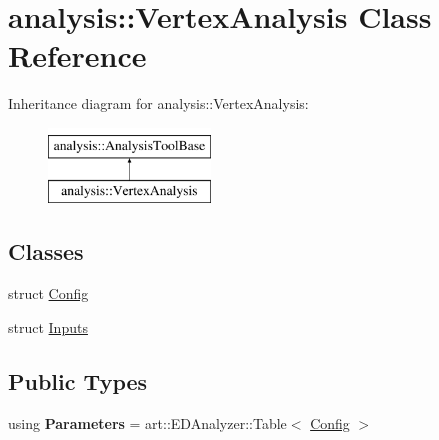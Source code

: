 \hypertarget{classanalysis_1_1VertexAnalysis}{}\section{analysis\+:\+:Vertex\+Analysis Class Reference}
\label{classanalysis_1_1VertexAnalysis}
Inheritance diagram for analysis\+:\+:Vertex\+Analysis\+:\begin{figure}[H]
\begin{center}
\leavevmode
\includegraphics[height=2.000000cm]{classanalysis_1_1VertexAnalysis}
\end{center}
\end{figure}
\subsection*{Classes}
\begin{DoxyCompactItemize}
\item 
struct \hyperlink{structanalysis_1_1VertexAnalysis_1_1Config}{Config}
\item 
struct \hyperlink{structanalysis_1_1VertexAnalysis_1_1Inputs}{Inputs}
\end{DoxyCompactItemize}
\subsection*{Public Types}
\begin{DoxyCompactItemize}
\item 
using {\bfseries Parameters} = art\+::\+E\+D\+Analyzer\+::\+Table$<$ \hyperlink{structanalysis_1_1VertexAnalysis_1_1Config}{Config} $>$\hypertarget{classanalysis_1_1VertexAnalysis_a33673938d9d2ca6601dddb81d219b187}{}\label{classanalysis_1_1VertexAnalysis_a33673938d9d2ca6601dddb81d219b187}

\end{DoxyCompactItemize}
